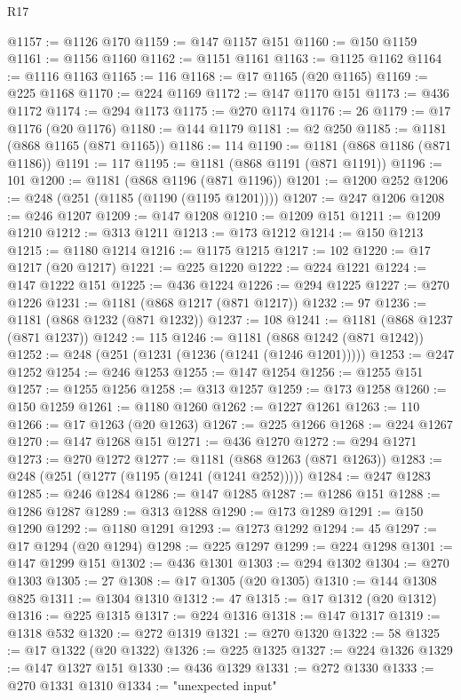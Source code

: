 \begin{lexlean}{R17}
\begin{coremodule}
@1157 := @1126 @170
@1159 := @147 @1157 @151
@1160 := @150 @1159
@1161 := @1156 @1160
@1162 := @1151 @1161
@1163 := @1125 @1162
@1164 := @1116 @1163
@1165 := 116
@1168 := @17 @1165 (@20 @1165)
@1169 := @225 @1168
@1170 := @224 @1169
@1172 := @147 @1170 @151
@1173 := @436 @1172
@1174 := @294 @1173
@1175 := @270 @1174
@1176 := 26
@1179 := @17 @1176 (@20 @1176)
@1180 := @144 @1179
@1181 := @2 @250
@1185 := @1181 (@868 @1165 (@871 @1165))
@1186 := 114
@1190 := @1181 (@868 @1186 (@871 @1186))
@1191 := 117
@1195 := @1181 (@868 @1191 (@871 @1191))
@1196 := 101
@1200 := @1181 (@868 @1196 (@871 @1196))
@1201 := @1200 @252
@1206 := @248 (@251 (@1185 (@1190 (@1195 @1201))))
@1207 := @247 @1206
@1208 := @246 @1207
@1209 := @147 @1208
@1210 := @1209 @151
@1211 := @1209 @1210
@1212 := @313 @1211
@1213 := @173 @1212
@1214 := @150 @1213
@1215 := @1180 @1214
@1216 := @1175 @1215
@1217 := 102
@1220 := @17 @1217 (@20 @1217)
@1221 := @225 @1220
@1222 := @224 @1221
@1224 := @147 @1222 @151
@1225 := @436 @1224
@1226 := @294 @1225
@1227 := @270 @1226
@1231 := @1181 (@868 @1217 (@871 @1217))
@1232 := 97
@1236 := @1181 (@868 @1232 (@871 @1232))
@1237 := 108
@1241 := @1181 (@868 @1237 (@871 @1237))
@1242 := 115
@1246 := @1181 (@868 @1242 (@871 @1242))
@1252 := @248 (@251 (@1231 (@1236 (@1241 (@1246 @1201)))))
@1253 := @247 @1252
@1254 := @246 @1253
@1255 := @147 @1254
@1256 := @1255 @151
@1257 := @1255 @1256
@1258 := @313 @1257
@1259 := @173 @1258
@1260 := @150 @1259
@1261 := @1180 @1260
@1262 := @1227 @1261
@1263 := 110
@1266 := @17 @1263 (@20 @1263)
@1267 := @225 @1266
@1268 := @224 @1267
@1270 := @147 @1268 @151
@1271 := @436 @1270
@1272 := @294 @1271
@1273 := @270 @1272
@1277 := @1181 (@868 @1263 (@871 @1263))
@1283 := @248 (@251 (@1277 (@1195 (@1241 (@1241 @252)))))
@1284 := @247 @1283
@1285 := @246 @1284
@1286 := @147 @1285
@1287 := @1286 @151
@1288 := @1286 @1287
@1289 := @313 @1288
@1290 := @173 @1289
@1291 := @150 @1290
@1292 := @1180 @1291
@1293 := @1273 @1292
@1294 := 45
@1297 := @17 @1294 (@20 @1294)
@1298 := @225 @1297
@1299 := @224 @1298
@1301 := @147 @1299 @151
@1302 := @436 @1301
@1303 := @294 @1302
@1304 := @270 @1303
@1305 := 27
@1308 := @17 @1305 (@20 @1305)
@1310 := @144 @1308 @825
@1311 := @1304 @1310
@1312 := 47
@1315 := @17 @1312 (@20 @1312)
@1316 := @225 @1315
@1317 := @224 @1316
@1318 := @147 @1317
@1319 := @1318 @532
@1320 := @272 @1319
@1321 := @270 @1320
@1322 := 58
@1325 := @17 @1322 (@20 @1322)
@1326 := @225 @1325
@1327 := @224 @1326
@1329 := @147 @1327 @151
@1330 := @436 @1329
@1331 := @272 @1330
@1333 := @270 @1331 @1310
@1334 := "unexpected input"

\end{coremodule}
\end{lexlean}
